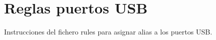 
\chapter{Reglas puertos USB} %

\label{app:rules} %

Instrucciones del fichero rules para asignar alias a los puertos USB.

\newpage



